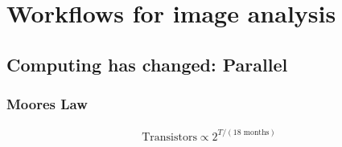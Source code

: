 \documentclass[letterpaper,10pt,english]{sphinxmanual}
\begin{document}
\chapter{Workflows for image analysis}
\label{\detokenize{01-Introduction:workflows-for-image-analysis}}

\section{Computing has changed: Parallel}
\label{\detokenize{01-Introduction:computing-has-changed-parallel}}

\subsection{Moores Law}
\label{\detokenize{01-Introduction:moores-law}}\begin{equation*}
\begin{split} \textrm{Transistors} \propto 2^{T/(\textrm{18 months})} \end{split}
\end{equation*}
\end{document}
